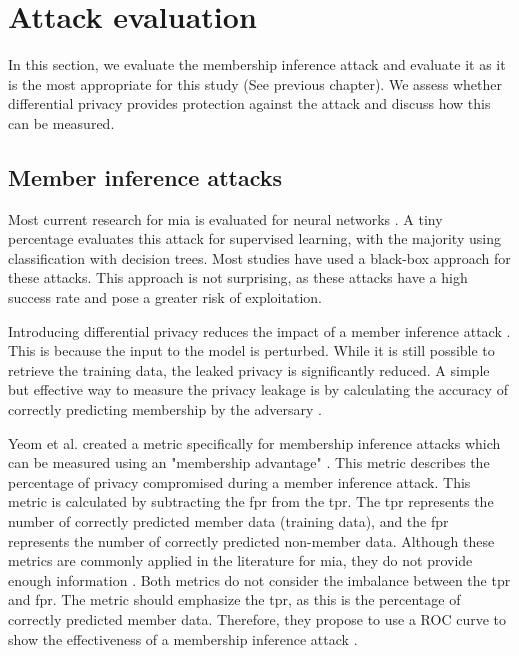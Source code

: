 



\section{Attack evaluation} \label{theory:attack-evaluation}
In this section, we evaluate the membership inference attack and evaluate it as it is the most appropriate for this study (See previous chapter).
We assess whether differential privacy provides protection against the attack and discuss how this can be measured.
\subsection{Member inference attacks}
Most current research for \gls{mia} is evaluated for neural networks \citep{rigaki_survey_2021}.
A tiny percentage evaluates this attack for supervised learning, with the majority using classification with decision trees.
Most studies have used a black-box approach \citep{rigaki_survey_2021} for these attacks.
This approach is not surprising, as these attacks have a high success rate and pose a greater risk of exploitation.

Introducing differential privacy reduces the impact of a member inference attack \citep{rigaki_survey_2021,hu_membership_2022}.
This is because the input to the model is perturbed.
While it is still possible to retrieve the training data, the leaked privacy is significantly reduced.
A simple but effective way to measure the privacy leakage is by calculating the accuracy of correctly predicting membership by the adversary \citep{choquette-choo_label-only_2021}.

Yeom et al. created a metric specifically for membership inference attacks which can be measured using an "membership advantage" \citep{yeom_privacy_2018}.
This metric describes the percentage of privacy compromised during a member inference attack.
This metric is calculated by subtracting the \gls{fpr} from the \gls{tpr}.
The \gls{tpr} represents the number of correctly predicted member data (training data), and the \gls{fpr} represents the number of correctly predicted non-member data.
Although these metrics are commonly applied in the literature for \gls{mia}, they do not provide enough information \citep{carlini_membership_2022}.
Both metrics do not consider the imbalance between the \gls{tpr} and \gls{fpr}.
The metric should emphasize the \gls{tpr}, as this is the percentage of correctly predicted member data.
Therefore, they propose to use a ROC curve to show the effectiveness of a membership inference attack \citep{carlini_membership_2022}. \newline

